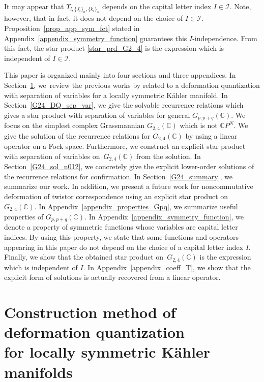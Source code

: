\documentclass[10pt,a4paper]{amsart}
\numberwithin{equation}{section}
\begin{document}
It may appear that
$\Upsilon_{l,\{J_{i}\}_{n},\{k_{i}\}_{n}}$
depends on the capital letter index $I\in\mathcal{I}$. Note, however, that in fact, it does not depend on the choice of $I\in\mathcal{I}$. Proposition~\ref{prop_app_sym_fct} stated in Appendix~\ref{appendix_symmetry_function} guarantees this $I$-independence. From this fact, the star product \eqref{star_prd_G2_4} is the expression which is independent of $I\in\mathcal{I}$.

This paper is organized mainly into four sections and three appendices. In Section~\ref{G24_review}, we~review the previous works by
\cite{HS1,HS2} related to a deformation quantization with separation of variables for a locally symmetric K\"ahler manifold. In Section~\ref{G24_DQ_sep_var}, we give the solvable recurrence relations which gives a star product with separation of variables for general $G_{p,p+q}(\mathbb{C})$. We focus on the simplest complex Grassmannian $G_{2,4}(\mathbb{C})$ which is not $\mathbb{C}P^{N}$. We give the solution of the recurrence relations for $G_{2,4}(\mathbb{C})$ by using a linear operator on a Fock space. Furthermore, we construct an explicit star product with separation of variables on~$G_{2,4}(\mathbb{C})$ from the solution. In Section~\ref{G24_sol_n012}, we concretely give the explicit lower-order solutions of the recurrence relations for confirmation. In Section~\ref{G24_summary}, we summarize our work. In addition, we present a future work for noncommutative deformation of twistor correspondence using an explicit star product on~$G_{2,4}(\mathbb{C})$.
In Appendix~\ref{appendix_properties_Gpq}, we summarize useful properties of $G_{p,p+q}(\mathbb{C})$. In Appendix~\ref{appendix_symmetry_function}, we denote a property of symmetric functions whose variables are capital letter indices. By using this property, we state that some functions and operators appearing in this paper do not depend on the choice of a capital letter index $I$. Finally, we show that the obtained star product on~$G_{2,4}(\mathbb{C})$ is the expression which is independent of $I$. In Appendix~\ref{appendix_coeff_T}, we show that the explicit form of solutions is actually recovered from a linear operator.


\section[Construction method of deformation quantization for locally symmetric Kahler manifolds]{Construction method of deformation quantization\\ for locally symmetric K\"ahler manifolds}
\label{G24_review}
\end{document}
